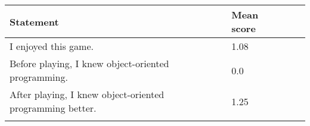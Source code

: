 \begin{tabu}{Xlll}
\toprule
Statement & Mean score \\
\midrule
I enjoyed this game. & 1.08 \\
Before playing, I knew object-oriented programming. & 0.0 \\
After playing, I knew object-oriented programming better. & 1.25\\
\bottomrule
\\
\end{tabu}
